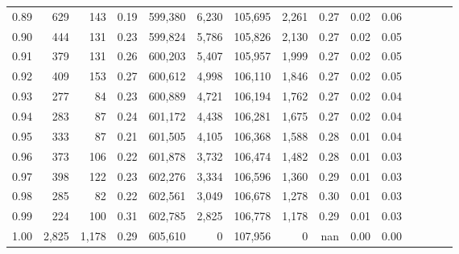 \begin{tabular}{rrrcrrrrrrrrrrr}
0.89 &     629 &     143 &                                       0.19 &  599,380 &    6,230 &  105,695 &    2,261 &  0.27 &  0.02 &                         0.06 \\
0.90 &     444 &     131 &                                       0.23 &  599,824 &    5,786 &  105,826 &    2,130 &  0.27 &  0.02 &                         0.05 \\
0.91 &     379 &     131 &                                       0.26 &  600,203 &    5,407 &  105,957 &    1,999 &  0.27 &  0.02 &                         0.05 \\
0.92 &     409 &     153 &                                       0.27 &  600,612 &    4,998 &  106,110 &    1,846 &  0.27 &  0.02 &                         0.05 \\
0.93 &     277 &      84 &                                       0.23 &  600,889 &    4,721 &  106,194 &    1,762 &  0.27 &  0.02 &                         0.04 \\
0.94 &     283 &      87 &                                       0.24 &  601,172 &    4,438 &  106,281 &    1,675 &  0.27 &  0.02 &                         0.04 \\
0.95 &     333 &      87 &                                       0.21 &  601,505 &    4,105 &  106,368 &    1,588 &  0.28 &  0.01 &                         0.04 \\
0.96 &     373 &     106 &                                       0.22 &  601,878 &    3,732 &  106,474 &    1,482 &  0.28 &  0.01 &                         0.03 \\
0.97 &     398 &     122 &                                       0.23 &  602,276 &    3,334 &  106,596 &    1,360 &  0.29 &  0.01 &                         0.03 \\
0.98 &     285 &      82 &                                       0.22 &  602,561 &    3,049 &  106,678 &    1,278 &  0.30 &  0.01 &                         0.03 \\
0.99 &     224 &     100 &                                       0.31 &  602,785 &    2,825 &  106,778 &    1,178 &  0.29 &  0.01 &                         0.03 \\
1.00 &   2,825 &   1,178 &                                       0.29 &  605,610 &        0 &  107,956 &        0 &   nan &  0.00 &                         0.00 \\
\bottomrule
\end{tabular}
